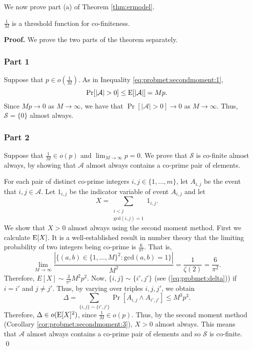 We now prove part (a) of Theorem \ref{thm:ermodel}.

\begin{theorem}\label{thm:ermodel:co-finite}
     $\frac{1}{M}$ is a threshold function for co-finiteness.
\end{theorem}

\textbf{Proof. } We prove the two parts of the theorem separately. 
\subsubsection*{Part 1}
Suppose that $p \in o\left(\frac{1}{M}\right)$. As in Inequality \ref{eq:probmet:secondmoment:1}, 
\[\mathrm{Pr}[|\mathcal{A}| > 0] \leq \mathrm{E}[|\mathcal{A}|] = Mp.\]
Since $Mp \to 0$ as $M \to \infty$, we have that $\Pr[|\mathcal{A}| > 0] \to 0$ as $M \to \infty$. Thus, $\mathcal{S} = \{0\}$ almost always. \par

\subsubsection*{Part 2}
Suppose that $\frac{1}{M} \in o(p)$ and $\lim_{M \to \infty} p = 0$. We prove that $\mathcal{S}$ is co-finite almost always, by showing that $\mathcal{A}$ almost always contains a co-prime pair of elements. \par
For each pair of distinct co-prime integers $i, j \in \{1,\ldots, m\}$, let $A_{i, j}$ be the event that $i, j \in \mathcal{A}$. Let $1_{i, j}$ be the indicator variable of event $A_{i, j}$ and let 
\[X = \sum_{\substack{i < j \\ \mathrm{gcd}(i, j) = 1}} 1_{i, j}.\]
We show that $X > 0$ almost always using the second moment method. First we calculate $\mathrm{E}[X]$. It is a well-established result in number theory \cite[Theorem 332]{hardy1979introduction} that the limiting probability of two integers being co-prime is $\frac{6}{\pi^2}$. That is,
\[\lim_{M \to \infty} \frac{|\{(a, b) \in \{1, \ldots, M\}^2: \mathrm{gcd}(a, b) = 1\}|}{M^2} = \frac{1}{\zeta(2)} =\frac{6}{\pi^2}.\]
Therefore, $E[X] \sim \frac{3}{\pi^2}M^2p^2$. Now, $\{i, j\} \sim \{i', j'\}$ (see (\ref{eq:probmet:delta})) if $i = i'$ and $j \neq j'$. Thus, by varying over triples $i, j, j'$, we obtain
\[\Delta = \sum_{\{i, j\} \sim \{i', j'\}}\Pr[A_{i, j}\land A_{i', j'}] \leq M^3p^3.\]
Therefore, $\Delta \in o(\mathrm{E}[X]^2)$, since $\frac{1}{M} \in o(p)$. Thus, by the second moment method (Corollary \ref{cor:probmet:secondmoment:3}), $X > 0$ almost always. This means that $\mathcal{A}$ almost always contains a co-prime pair of elements and so $\mathcal{S}$ is co-finite. \qed \par

